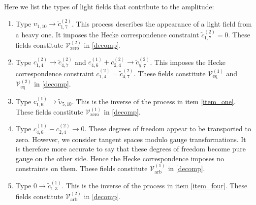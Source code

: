 \documentclass[10pt]{article}
\theoremstyle{definition}
\def\sV{{\mathscr{V}}}
\numberwithin{equation}{section}
\begin{document}
Here we list the types of light fields that contribute to the amplitude:
\begin{enumerate}
	\item\label{item_one} Type $\upsilon_{1,10}\to\tilde c_{1,7}^{(2)}$.
	This process describes the appearance of a light field from a heavy one.
	It imposes the Hecke correspondence constraint $\tilde c_{1,7}^{(2)}=0$.
	These fields constitute $\sV^{(2)}_{\mathrm{zero}}$ in \eqref{decomp}.
	\item Type $c_{1,4}^{(2)}\to\tilde c_{4,7}^{(2)}$ and $c_{4,6}^{(1)}+c_{2,4}^{(2)}\to\tilde c_{5,7}^{(2)}$.
	This imposes the Hecke correspondence constraint $c_{1,4}^{(2)}=\tilde c_{4,7}^{(2)}$.
	These fields constitute $\sV^{(1)}_{\mathrm{eq}}$ and $\sV^{(2)}_{\mathrm{eq}}$ in \eqref{decomp}.
	\item Type $c_{1,6}^{(1)}\to\tilde\upsilon_{5,10}$.
	This is the inverse of the process in item \ref{item_one}.
	These fields constitute $\sV^{(1)}_{\mathrm{zero}}$ in \eqref{decomp}.
	\item\label{item_four} Type $c_{4,6}^{(1)}-c_{2,4}^{(2)}\to 0$.
	These degrees of freedom appear to be transported to zero.
	However, we consider tangent spaces modulo gauge transformations.
	It is therefore more accurate to say that these degrees of freedom become pure gauge on the other side.
	Hence the Hecke correspondence imposes no constraints on them.
	These fields constitute $\sV^{(1)}_{\mathrm{arb}}$ in \eqref{decomp}.
	\item Type $0\to\tilde c_{1,3}^{(1)}$.
	This is the inverse of the process in item \ref{item_four}.
	These fields constitute $\sV^{(2)}_{\mathrm{arb}}$ in \eqref{decomp}.
\end{enumerate}
\end{document}

